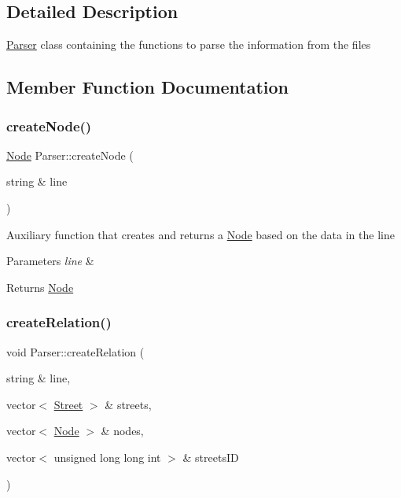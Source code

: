 \subsection{Detailed Description}
\mbox{\hyperlink{class_parser}{Parser}} class containing the functions to parse the information from the files 

\subsection{Member Function Documentation}
\mbox{\label{class_parser_a69118b5346049a40a31eabcdbdbe1d4f}} 
\subsubsection{\texorpdfstring{create\+Node()}{createNode()}}
{\footnotesize\ttfamily \mbox{\hyperlink{class_node}{Node}} Parser\+::create\+Node (\begin{DoxyParamCaption}\item[{string \&}]{line }\end{DoxyParamCaption})}

Auxiliary function that creates and returns a \mbox{\hyperlink{class_node}{Node}} based on the data in the line 
\begin{DoxyParams}{Parameters}
{\em line} & \\
\hline
\end{DoxyParams}
\begin{DoxyReturn}{Returns}
\mbox{\hyperlink{class_node}{Node}} 
\end{DoxyReturn}
\mbox{\label{class_parser_abc6f5fd0f2bf4a8ecca4b23c4a84d168}} 
\subsubsection{\texorpdfstring{create\+Relation()}{createRelation()}}
{\footnotesize\ttfamily void Parser\+::create\+Relation (\begin{DoxyParamCaption}\item[{string \&}]{line,  }\item[{vector$<$ \mbox{\hyperlink{class_street}{Street}} $>$ \&}]{streets,  }\item[{vector$<$ \mbox{\hyperlink{class_node}{Node}} $>$ \&}]{nodes,  }\item[{vector$<$ unsigned long long int $>$ \&}]{streets\+ID }\end{DoxyParamCaption})}




